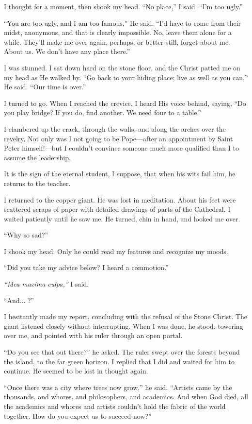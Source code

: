 I thought for a moment, then shook my head. ``No place,'' I said. ``I'm too ugly.''

``You are too ugly, and I am too famous,'' He said. ``I'd have to come from their midst, anonymous, and that is clearly impossible. No, leave them alone for a while. They'll make me over again, perhaps, or better still, forget about me. About us. We don't have any place there.''

I was stunned. I sat down hard on the stone floor, and the Christ patted me on my head as He walked by. ``Go back to your hiding place; live as well as you can,'' He said. ``Our time is over.''

I turned to go. When I reached the crevice, I heard His voice behind, saying, ``Do you play bridge? If you do, find another. We need four to a table.''

I clambered up the crack, through the walls, and along the arches over the revelry. Not only was I not going to be Pope—after an appointment by Saint Peter himself!—but I couldn't convince someone much more qualified than I to assume the leadership.

It is the sign of the eternal student, I suppose, that when his wits fail him, he returns to the teacher.

I returned to the copper giant. He was lost in meditation. About his feet were scattered scraps of paper with detailed drawings of parts of the Cathedral. I waited patiently until he saw me. He turned, chin in hand, and looked me over.

``Why so sad?''

I shook my head. Only he could read my features and recognize my moods.

``Did you take my advice below? I heard a commotion.''

\textit{``Mea maxima culpa,''} I said.

``And... ?''

I hesitantly made my report, concluding with the refusal of the Stone Christ. The giant listened closely without interrupting. When I was done, he stood, towering over me, and pointed with his ruler through an open portal.

``Do you see that out there?'' he asked. The ruler swept over the forests beyond the island, to the far green horizon. I replied that I did and waited for him to continue. He seemed to be lost in thought again.

``Once there was a city where trees now grow,'' he said. ``Artists came by the thousands, and whores, and philosophers, and academics. And when God died, all the academics and whores and artists couldn't hold the fabric of the world together. How do you expect us to succeed now?''

